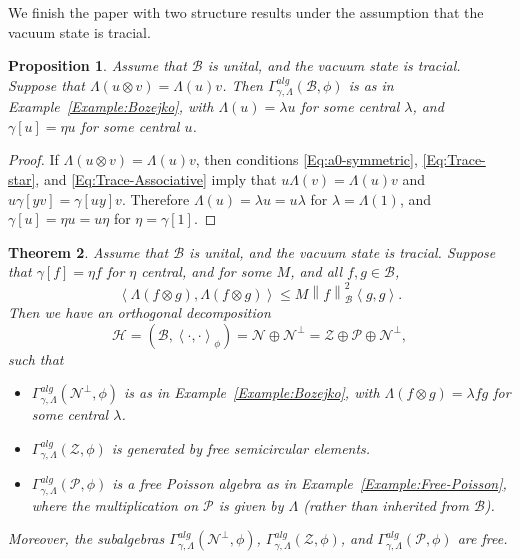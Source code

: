 \documentclass[12pt]{amsart}
\newtheorem{Thm}{Theorem}
\newtheorem{Prop}[Thm]{Proposition}
\theoremstyle{definition}
\newcommand{\mc}[1]{\mathcal{#1}}
\newcommand{\ip}[2]{\left \langle{#1},{#2} \right \rangle}
\newcommand{\norm}[1]{\left \|{#1} \right \|}
\begin{document}
We finish the paper with two structure results under the assumption that the vacuum state is tracial.




\begin{Prop}
Assume that $\mc{B}$ is unital, and the vacuum state is tracial. Suppose that $\Lambda(u \otimes v) = \Lambda(u) v$. Then $\Gamma^{alg}_{\gamma, \Lambda}(\mc{B}, \phi)$ is as in Example~\ref{Example:Bozejko}, with $\Lambda(u) = \lambda u$ for some central $\lambda$, and $\gamma[u] = \eta u$ for some central $u$.
\end{Prop}


\begin{proof}
If $\Lambda(u \otimes v) = \Lambda(u) v$, then conditions \eqref{Eq:a0-symmetric}, \eqref{Eq:Trace-star}, and \eqref{Eq:Trace-Associative} imply that $u \Lambda(v) = \Lambda(u) v$ and $u \gamma[y v] = \gamma[u y] v$. Therefore $\Lambda(u) = \lambda u = u \lambda$ for $\lambda = \Lambda(1)$, and $\gamma[u] = \eta u = u \eta$ for $\eta = \gamma[1]$.
\end{proof}



\begin{Thm}
Assume that $\mc{B}$ is unital, and the vacuum state is tracial. Suppose that $\gamma[f] = \eta f$ for $\eta$ central, and for some $M$, and all $f, g \in \mc{B}$,
\begin{equation}
\label{Eq:Hilbert-algebra}
\ip{\Lambda(f \otimes g)}{\Lambda(f \otimes g)} \leq M \norm{f}_{\mc{B}}^2 \ip{g}{g}.
\end{equation}
Then we have an orthogonal decomposition
\[
\mc{H} = (\mc{B}, \ip{\cdot}{\cdot}_\phi) = \mc{N} \oplus \mc{N}^\perp = \mc{Z} \oplus \mc{P} \oplus \mc{N}^\perp,
\]
such that
\begin{itemize}
\item
$\Gamma^{alg}_{\gamma, \Lambda}(\mc{N}^\perp, \phi)$ is as in Example~\ref{Example:Bozejko}, with $\Lambda(f \otimes g) = \lambda f g$ for some central $\lambda$.
\item
$\Gamma^{alg}_{\gamma, \Lambda}(\mc{Z}, \phi)$ is generated by free semicircular elements.
\item
$\Gamma^{alg}_{\gamma, \Lambda}(\mc{P}, \phi)$ is a free Poisson algebra as in Example~\ref{Example:Free-Poisson}, where the multiplication on $\mc{P}$ is given by $\Lambda$ (rather than inherited from $\mc{B}$).
\end{itemize}
Moreover, the subalgebras $\Gamma^{alg}_{\gamma, \Lambda}(\mc{N}^\perp, \phi)$, $\Gamma^{alg}_{\gamma, \Lambda}(\mc{Z}, \phi)$, and $\Gamma^{alg}_{\gamma, \Lambda}(\mc{P}, \phi)$ are free.
\end{Thm}
\end{document}
